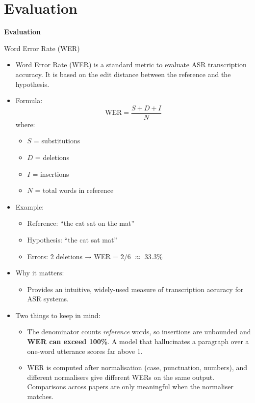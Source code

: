 \section{Evaluation}
\begin{frame}{}
    \LARGE \textbf{Evaluation}
\end{frame}

\begin{frame}[allowframebreaks]{Word Error Rate (WER)}

\begin{itemize}
    \item Word Error Rate (WER) is a standard metric to evaluate ASR transcription accuracy.
    It is based on the edit distance between the reference and the hypothesis.

    \item Formula:
    \[
        \text{WER} = \frac{S + D + I}{N}
    \]
    where:
    \begin{itemize}
        \item $S$ = substitutions
        \item $D$ = deletions
        \item $I$ = insertions
        \item $N$ = total words in reference
    \end{itemize}
\framebreak
    \item Example:
    \begin{itemize}
        \item Reference: ``the cat sat on the mat''
        \item Hypothesis: ``the cat sat mat''
        \item Errors: 2 deletions → WER = 2/6 $\approx$ 33.3\%
    \end{itemize}

    \item Why it matters:
    \begin{itemize}
        \item Provides an intuitive, widely-used measure of transcription accuracy for ASR systems.
    \end{itemize}

    \item Two things to keep in mind:
    \begin{itemize}
        \item The denominator counts \emph{reference} words, so insertions are unbounded and \textbf{WER can exceed 100\%}. A model that hallucinates a paragraph over a one-word utterance scores far above 1.
        \item WER is computed after normalisation (case, punctuation, numbers), and different normalisers give different WERs on the same output. Comparisons across papers are only meaningful when the normaliser matches.
    \end{itemize}
\end{itemize}

\end{frame}

